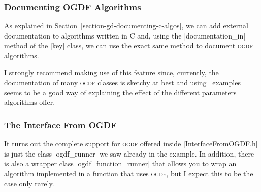 \subsubsection{Documenting OGDF Algorithms}

As explained in Section~\ref{section-gd-documenting-c-algos}, we can
add external documentation to algorithms written in C and, using the
|documentation_in| method of the |key| class, we can use the exact
same method to document \textsc{ogdf} algorithms.

I strongly recommend making use of this feature since, currently, the
documentation of many \textsc{ogdf} classes is sketchy at best and
using \tikzname\ examples seems to be a good way of explaining the
effect of the different parameters algorithms offer.



\subsubsection{The Interface From OGDF}

It turns out the complete support for \textsc{ogdf} offered inside
|InterfaceFromOGDF.h| is just the class |ogdf_runner| we saw already
in the example. In addition, there is also a wrapper class
|ogdf_function_runner| that allows you to wrap an algorithm
implemented in a function that uses \textsc{ogdf}, but I expect this
to be the case only rarely.

